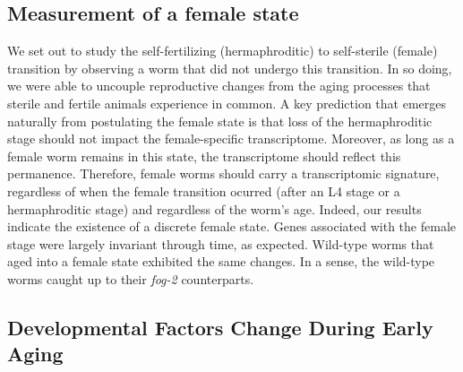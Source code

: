\documentclass[9pt,twocolumn,twoside]{gsag3jnl}
\newcommand{\fog}{\emph{fog-2}}
\begin{document}
\subsection{Measurement of a female state}
\label{sub:female_state}

We set out to study the self-fertilizing (hermaphroditic) to self-sterile (female) transition by observing a worm that did not undergo this transition. In so doing, we were able to uncouple reproductive changes from the aging processes that sterile and fertile animals experience in common. A key prediction that emerges naturally from postulating the female state is that loss of the hermaphroditic stage should not impact the female-specific transcriptome. Moreover, as long as a female worm remains in this state, the transcriptome should reflect this permanence. Therefore, female worms should carry a transcriptomic signature, regardless of when the female transition ocurred (after an L4 stage or a hermaphroditic stage) and regardless of the worm's age.
Indeed, our results indicate the existence of a discrete female state. Genes associated with the female stage were largely invariant through time, as expected. Wild-type worms that aged into a female state exhibited the same changes. In a sense, the wild-type worms caught up to their \fog{} counterparts.



\subsection*{Developmental Factors Change During Early Aging}
\label{sub:development_in_aging}
\end{document}
